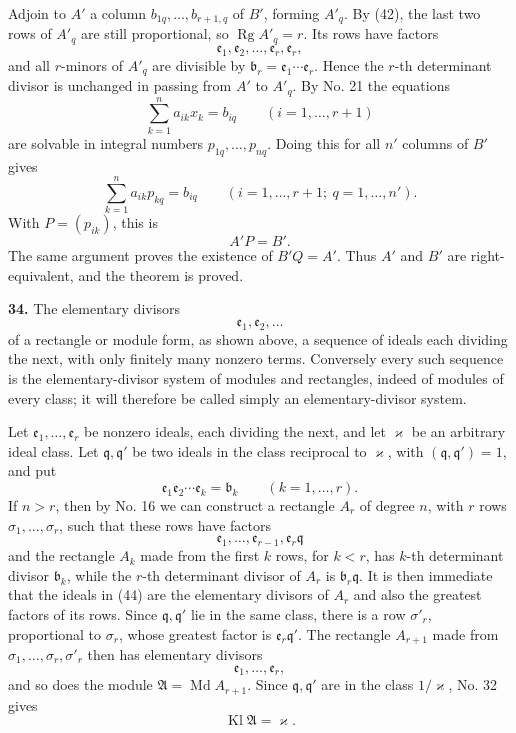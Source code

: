 \documentclass[11pt,a4paper]{article}
\newcommand{\Kl}{\operatorname{Kl}}
\begin{document}
Adjoin to \(A'\) a column \(b_{1q},\ldots,b_{r+1,q}\) of \(B'\), forming \(A'_q\). By (42), the last two rows of \(A'_q\) are still proportional, so \(\operatorname{Rg}A'_q=r\). Its rows have factors
\[
 \mathfrak e_1,\mathfrak e_2,\ldots,\mathfrak e_r,\mathfrak e_r,
\]
and all \(r\)-minors of \(A'_q\) are divisible by \(\mathfrak b_r=\mathfrak e_1\cdots\mathfrak e_r\). Hence the \(r\)-th determinant divisor is unchanged in passing from \(A'\) to \(A'_q\). By No. 21 the equations
\[
 \sum_{k=1}^{n}a_{ik}x_k=b_{iq}\qquad(i=1,\ldots,r+1)
\]
are solvable in integral numbers \(p_{1q},\ldots,p_{nq}\). Doing this for all \(n'\) columns of \(B'\) gives
\[
 \sum_{k=1}^{n}a_{ik}p_{kq}=b_{iq}\qquad(i=1,\ldots,r+1;\ q=1,\ldots,n'). \tag{43}
\]
With \(P=(p_{ik})\), this is
\[
 A'P=B'.
\]
The same argument proves the existence of \(B'Q=A'\). Thus \(A'\) and \(B'\) are right-equivalent, and the theorem is proved.

\textbf{34.} The elementary divisors
\[
 \mathfrak e_1,\mathfrak e_2,\ldots
\]
of a rectangle or module form, as shown above, a sequence of ideals each dividing the next, with only finitely many nonzero terms. Conversely every such sequence is the elementary-divisor system of modules and rectangles, indeed of modules of every class; it will therefore be called simply an elementary-divisor system.

Let \(\mathfrak e_1,\ldots,\mathfrak e_r\) be nonzero ideals, each dividing the next, and let \(\varkappa\) be an arbitrary ideal class. Let \(\mathfrak q,\mathfrak q'\) be two ideals in the class reciprocal to \(\varkappa\), with \((\mathfrak q,\mathfrak q')=1\), and put
\[
 \mathfrak e_1\mathfrak e_2\cdots\mathfrak e_k=\mathfrak b_k\qquad(k=1,\ldots,r).
\]
If \(n>r\), then by No. 16 we can construct a rectangle \(A_r\) of degree \(n\), with \(r\) rows \(\sigma_1,\ldots,\sigma_r\), such that these rows have factors
\[
 \mathfrak e_1,\ldots,\mathfrak e_{r-1},\mathfrak e_r\mathfrak q \tag{44}
\]
and the rectangle \(A_k\) made from the first \(k\) rows, for \(k<r\), has \(k\)-th determinant divisor \(\mathfrak b_k\), while the \(r\)-th determinant divisor of \(A_r\) is \(\mathfrak b_r\mathfrak q\). It is then immediate that the ideals in (44) are the elementary divisors of \(A_r\) and also the greatest factors of its rows. Since \(\mathfrak q,\mathfrak q'\) lie in the same class, there is a row \(\sigma'_r\), proportional to \(\sigma_r\), whose greatest factor is \(\mathfrak e_r\mathfrak q'\). The rectangle \(A_{r+1}\) made from \(\sigma_1,\ldots,\sigma_r,\sigma'_r\) then has elementary divisors
\[
 \mathfrak e_1,\ldots,\mathfrak e_r,
\]
and so does the module \(\mathfrak A=\operatorname{Md}A_{r+1}\). Since \(\mathfrak q,\mathfrak q'\) are in the class \(1/\varkappa\), No. 32 gives
\[
 \Kl\mathfrak A=\varkappa.
\]
\end{document}
